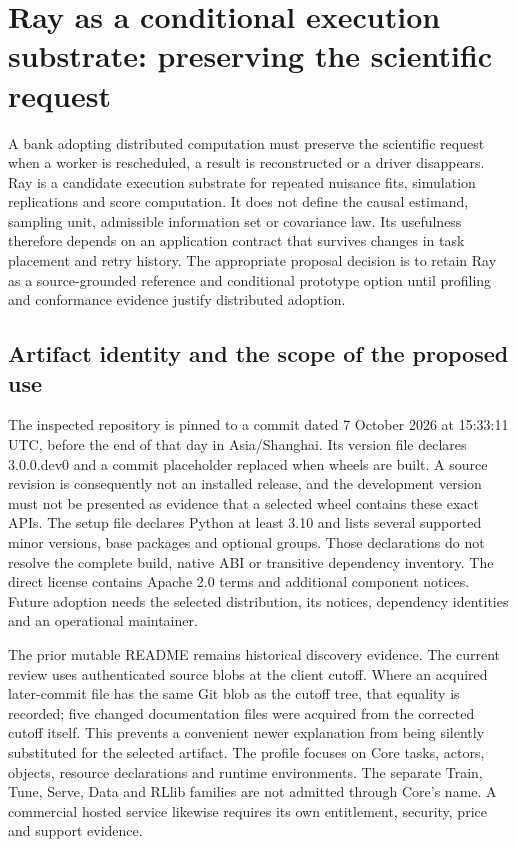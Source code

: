 \section{Ray as a conditional execution substrate: preserving the scientific request}
\label{sec:exec24-ray}
A bank adopting distributed computation must preserve the scientific request when a worker is rescheduled, a result is reconstructed or a driver disappears. Ray is a candidate execution substrate for repeated nuisance fits, simulation replications and score computation. It does not define the causal estimand, sampling unit, admissible information set or covariance law. Its usefulness therefore depends on an application contract that survives changes in task placement and retry history. The appropriate proposal decision is to retain Ray as a source-grounded reference and conditional prototype option until profiling and conformance evidence justify distributed adoption.~\citep{exec24_ray_sources,exec24_ray_contract}

\subsection{Artifact identity and the scope of the proposed use}
The inspected repository is pinned to a commit dated 7 October 2026 at 15:33:11 UTC, before the end of that day in Asia/Shanghai. Its version file declares 3.0.0.dev0 and a commit placeholder replaced when wheels are built. A source revision is consequently not an installed release, and the development version must not be presented as evidence that a selected wheel contains these exact APIs. The setup file declares Python at least 3.10 and lists several supported minor versions, base packages and optional groups. Those declarations do not resolve the complete build, native ABI or transitive dependency inventory. The direct license contains Apache 2.0 terms and additional component notices. Future adoption needs the selected distribution, its notices, dependency identities and an operational maintainer.~\citep{exec24_ray_sources}

The prior mutable README remains historical discovery evidence. The current review uses authenticated source blobs at the client cutoff. Where an acquired later-commit file has the same Git blob as the cutoff tree, that equality is recorded; five changed documentation files were acquired from the corrected cutoff itself. This prevents a convenient newer explanation from being silently substituted for the selected artifact. The profile focuses on Core tasks, actors, objects, resource declarations and runtime environments. The separate Train, Tune, Serve, Data and RLlib families are not admitted through Core's name. A commercial hosted service likewise requires its own entitlement, security, price and support evidence.~\citep{exec24_ray_sources,exec24_ray_contract}

